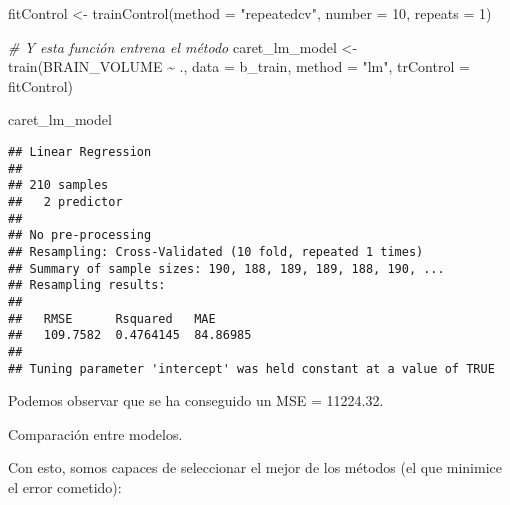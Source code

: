 \documentclass[
]{article}
\newenvironment{Shaded}{\begin{snugshade}}{\end{snugshade}}
\newcommand{\AttributeTok}[1]{\textcolor[rgb]{0.77,0.63,0.00}{#1}}
\newcommand{\CommentTok}[1]{\textcolor[rgb]{0.56,0.35,0.01}{\textit{#1}}}
\newcommand{\DecValTok}[1]{\textcolor[rgb]{0.00,0.00,0.81}{#1}}
\newcommand{\FunctionTok}[1]{\textcolor[rgb]{0.00,0.00,0.00}{#1}}
\newcommand{\NormalTok}[1]{#1}
\newcommand{\OtherTok}[1]{\textcolor[rgb]{0.56,0.35,0.01}{#1}}
\newcommand{\SpecialCharTok}[1]{\textcolor[rgb]{0.00,0.00,0.00}{#1}}
\newcommand{\StringTok}[1]{\textcolor[rgb]{0.31,0.60,0.02}{#1}}
\begin{document}
\begin{Shaded}
\begin{Highlighting}[]
\NormalTok{fitControl }\OtherTok{\textless{}{-}} \FunctionTok{trainControl}\NormalTok{(}\AttributeTok{method =} \StringTok{"repeatedcv"}\NormalTok{,}
                           \AttributeTok{number =} \DecValTok{10}\NormalTok{,}
                           \AttributeTok{repeats =} \DecValTok{1}\NormalTok{)}

\CommentTok{\# Y esta función entrena el método}
\NormalTok{caret\_lm\_model }\OtherTok{\textless{}{-}} \FunctionTok{train}\NormalTok{(BRAIN\_VOLUME }\SpecialCharTok{\textasciitilde{}}\NormalTok{ ., }
                        \AttributeTok{data =}\NormalTok{ b\_train, }
                        \AttributeTok{method =} \StringTok{"lm"}\NormalTok{,}
                        \AttributeTok{trControl =}\NormalTok{ fitControl)}
\end{Highlighting}
\end{Shaded}

\begin{Shaded}
\begin{Highlighting}[]
\NormalTok{caret\_lm\_model}
\end{Highlighting}
\end{Shaded}

\begin{verbatim}
## Linear Regression 
## 
## 210 samples
##   2 predictor
## 
## No pre-processing
## Resampling: Cross-Validated (10 fold, repeated 1 times) 
## Summary of sample sizes: 190, 188, 189, 189, 188, 190, ... 
## Resampling results:
## 
##   RMSE      Rsquared   MAE     
##   109.7582  0.4764145  84.86985
## 
## Tuning parameter 'intercept' was held constant at a value of TRUE
\end{verbatim}

Podemos observar que se ha conseguido un MSE = 11224.32.

Comparación entre modelos.

Con esto, somos capaces de seleccionar el mejor de los métodos (el que
minimice el error cometido):
\end{document}
